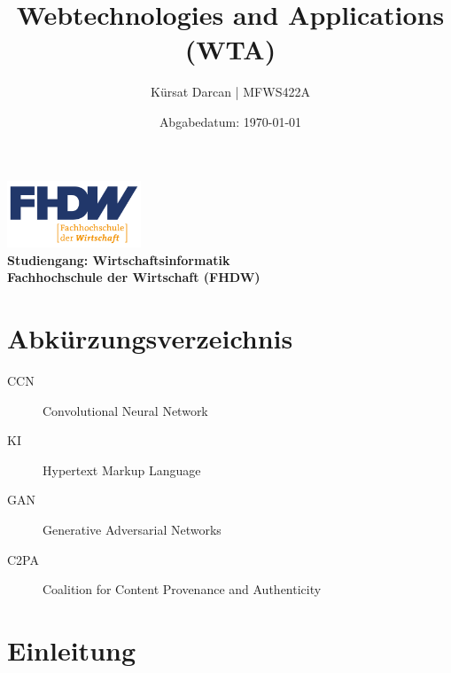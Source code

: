 \documentclass[a4paper,12pt]{article}
\title{\textbf{Webtechnologies and Applications (WTA)}}
\author{Kürsat Darcan | MFWS422A}
\date{Abgabedatum: \today}
\begin{document}
\maketitle
\thispagestyle{empty}
\vspace{2cm}
\begin{center}
    \includegraphics[width=0.3\textwidth]{FHDW_Logo_RGB-01.svg.png} %
    \\
    \vspace{1cm}
    \textbf{Studiengang: Wirtschaftsinformatik}\\
    \textbf{Fachhochschule der Wirtschaft (FHDW)}
\end{center}
\newpage

\renewcommand{\thepage}{\roman{page}} %
\tableofcontents
\newpage



\section*{Abkürzungsverzeichnis}
\begin{description}
    \item[CCN] Convolutional Neural Network
    \item[KI] Hypertext Markup Language
    \item[GAN] Generative Adversarial Networks
    \item[C2PA] Coalition for Content Provenance and Authenticity
\end{description}
\newpage

\renewcommand{\thepage}{\arabic{page}} %
\setcounter{page}{1}


\section{Einleitung}
\end{document}
